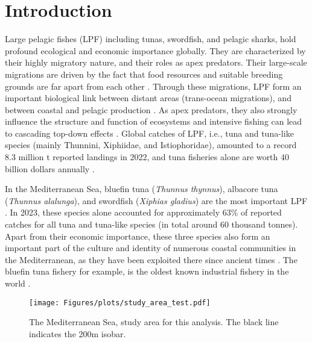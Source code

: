 \chapter{Introduction}
Large pelagic fishes (LPF) including tunas, swordfish, and pelagic sharks, hold profound ecological and economic importance globally.  They are characterized by their highly migratory nature, and their roles as apex predators. 
Their large-scale migrations are driven by the fact that food resources and suitable breeding grounds are far apart from each other \citep{fromentin_2005_tunareview,swordfish_migration,migration_lpf}. Through these migrations, LPF form 
an important biological link between distant areas (trans-ocean migrations), and between coastal and pelagic production \citep{linking_study}.
As apex predators, they also strongly influence the structure and function of ecosystems and intensive fishing can lead to cascading
top-down effects \citep{baum_worm_cascading,young15}. Global catches of LPF, i.e., tuna and tuna-like species (mainly Thunnini, Xiphiidae, and Istiophoridae),
amounted to a record 8.3 million t reported landings in 2022, and tuna fisheries alone are worth 40 billion dollars annually \citep{FAO2024,pew_tuna_value}.

\medskip

In the Mediterranean Sea,  bluefin tuna (\textit{Thunnus thynnus}), albacore tuna (\textit{Thunnus alalunga}), and swordfish (\textit{Xiphias gladius}) are the most important LPF \citep{fisheries_med_2000}.
In 2023, these species alone accounted for approximately 63\% of reported catches for all tuna and tuna-like species (in total around 60 thousand tonnes). Apart from their economic importance, these three species
also form an important part of the culture and identity of numerous coastal communities in the Mediterranean, as they have been exploited there since ancient times \citep{cultural_social_addis,usai_22_culture,natale2005}. 
The bluefin tuna fishery for example, is the oldest known industrial fishery in the world \citep{natale2012}.

\medskip

\begin{figure}[H]
    \texttt{[image: Figures/plots/study\_area\_test.pdf]}
    \caption{The Mediterranean Sea, study area for this analysis. The black line indicates the 200m isobar.}
    \label{fig:study_area}
\end{figure}

\medskip

